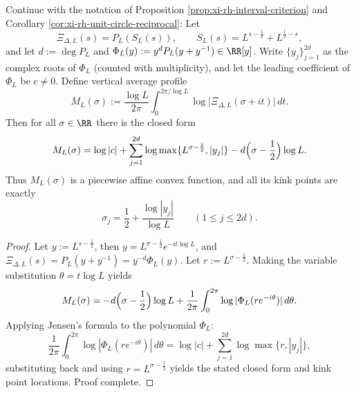 \begin{conclusion}\label{con:xi-terminal-single-scale-jensen-tropical-profile}
Continue with the notation of Proposition \ref{prop:xi-rh-interval-criterion} and Corollary \ref{cor:xi-rh-unit-circle-reciprocal}:
Let
\[
\Xi_{\Delta,L}(s)=P_L(S_L(s)),\qquad S_L(s)=L^{s-\frac12}+L^{\frac12-s},
\]
and let \(d:=\deg P_L\) and
\(
\Phi_L(y):=y^{d}P_L(y+y^{-1})\in\RR[y]
\).
Write \(\{y_j\}_{j=1}^{2d}\) as the complex roots of \(\Phi_L\) (counted with multiplicity), and let the leading coefficient of \(\Phi_L\) be \(c\neq 0\).
Define vertical average profile
\[
M_L(\sigma):=\frac{\log L}{2\pi}\int_{0}^{2\pi/\log L}\log\bigl|\Xi_{\Delta,L}(\sigma+it)\bigr|\,dt.
\]
Then for all \(\sigma\in\RR\) there is the closed form
\[
M_L(\sigma)=\log|c|+\sum_{j=1}^{2d}\log\max\{L^{\sigma-\frac12},|y_j|\}-d\Bigl(\sigma-\frac12\Bigr)\log L.
\]
Thus \(M_L(\sigma)\) is a piecewise affine convex function, and all its kink points are exactly
\[
\sigma_j=\frac12+\frac{\log|y_j|}{\log L}\qquad(1\le j\le 2d).
\]
\end{conclusion}
\begin{proof}[Proof]
Let \(y:=L^{s-\frac12}\), then \(y=L^{\sigma-\frac12}e^{-it\log L}\), and
\(
\Xi_{\Delta,L}(s)=P_L(y+y^{-1})=y^{-d}\Phi_L(y)
\).
Let \(r:=L^{\sigma-\frac12}\). Making the variable substitution \(\theta=t\log L\) yields
\[
M_L(\sigma)
=-d\Bigl(\sigma-\frac12\Bigr)\log L+\frac{1}{2\pi}\int_{0}^{2\pi}\log|\Phi_L(re^{-i\theta})|\,d\theta.
\]
Applying Jensen's formula to the polynomial \(\Phi_L\):
\[
\frac{1}{2\pi}\int_{0}^{2\pi}\log|\Phi_L(re^{-i\theta})|\,d\theta
=\log|c|+\sum_{j=1}^{2d}\log\max\{r,|y_j|\},
\]
substituting back and using \(r=L^{\sigma-\frac12}\) yields the stated closed form and kink point locations. Proof complete.
\end{proof}

